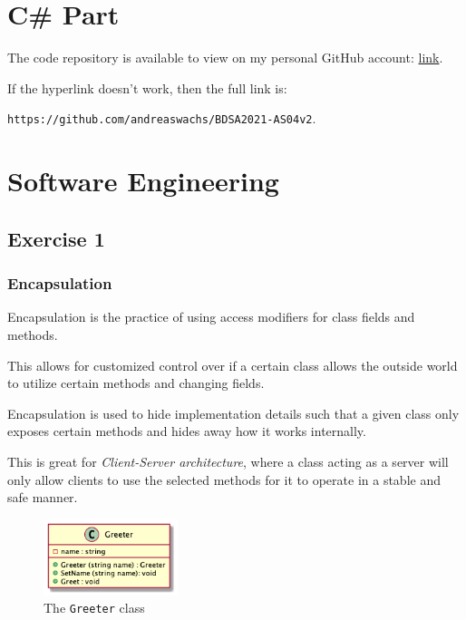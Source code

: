 \documentclass[12pt,letterpaper]{article}
\begin{document}
\section*{C\# Part}

\sloppy The code repository is available to view on my personal GitHub account: \hyperlink{https://github.com/andreaswachs/BDSA2021-AS04v2}{link}.

If the hyperlink doesn't work, then the full link is:

\texttt{https://github.com/andreaswachs/BDSA2021-AS04v2}.


\section*{Software Engineering}

\subsection*{Exercise 1}

\subsubsection*{Encapsulation}

Encapsulation is the practice of using access modifiers for class fields and methods.

This allows for customized control over if a certain class allows the outside world to utilize certain methods and changing fields.

Encapsulation is used to hide implementation details such that a given class only exposes certain methods and hides away how it works internally.

This is great for \textit{Client-Server architecture}, where a class acting as a server will only allow clients to use the selected methods for it to operate in a stable and safe manner. 

\begin{figure}
    \includegraphics[width=0.35\textwidth]{../out/Documents/plantuml/encapsulation/encapsulation.png}
    \caption{The \texttt{Greeter} class}
    \label{uml.classes.greeter}
\end{figure}
\end{document}
